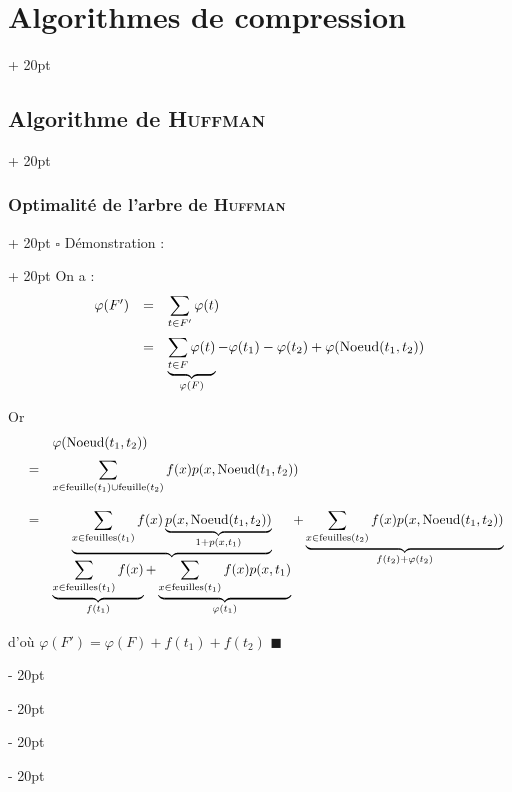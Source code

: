 \documentclass[a4paper, 12pt, twoside]{article}
\newcommand{\ind}[1][20pt]{\advance\leftskip + #1}
\newcommand{\deind}[1][20pt]{\advance\leftskip - #1}
\newenvironment{indt}[2][20pt]{#2 \par \ind[#1]}{\par \deind} %
\begin{document}
\begin{indt}{\section{Algorithmes de compression}}
\begin{indt}{\subsection{Algorithme de \textsc{Huffman}}}
\begin{indt}{\subsubsection{Optimalité de l'arbre de \textsc{Huffman}}}
                \begin{indt}{$\square$ Démonstration :}
                    On a :
                    \[
                        \begin{array}{rcl}
                            \varphi(F')
                            &=&
                            \displaystyle
                            \sum_{t \in F'} \varphi(t)
                            \vspace{6pt}
                            \\
                            &=& \displaystyle
                            \underbrace{\sum_{t \in F} \varphi(t)}_{\varphi(F)}
                            - \varphi(t_1) - \varphi(t_2)
                            + \varphi(\mathrm{Noeud}(t_1, t_2))
                        \end{array}
                    \]

                    Or
                    \[
                        \begin{array}{rcl}
                            && \varphi(\mathrm{Noeud}(t_1, t_2))
                            \vspace{6pt}
                            \\
                            &=& \displaystyle
                            \sum_{\substack{x \in \mathrm{feuille}(t_1) \cup \mathrm{feuille}(t_2)}} f(x) p(x, \mathrm{Noeud}(t_1, t_2))
                            \vspace{12pt}
                            \\
                            &=& \displaystyle
                            \underbrace{\sum_{x \in \mathrm{feuilles}(t_1)} f(x)
                            \underbrace{p(x, \mathrm{Noeud}(t_1, t_2))}_{1 + p(x, t_1)}}_{
                                \displaystyle
                                \underbrace{\sum_{x \in \mathrm{feuilles}(t_1)} f(x)}_{f(t_1)}
                                + \underbrace{\sum_{x \in \mathrm{feuilles}(t_1)} f(x) p(x, t_1)}_{\varphi(t_1)}
                            }
                            +
                            \underbrace{\sum_{x \in \mathrm{feuilles}(t_2)} f(x) p(x, \mathrm{Noeud}(t_1, t_2))}_{f(t_2) + \varphi(t_2)}
                        \end{array}
                    \]

                    d'où $\varphi(F') = \varphi(F) + f(t_1) + f(t_2)$ $\blacksquare$
                \end{indt}


\end{indt}
\end{indt}
\end{indt}
\end{document}
